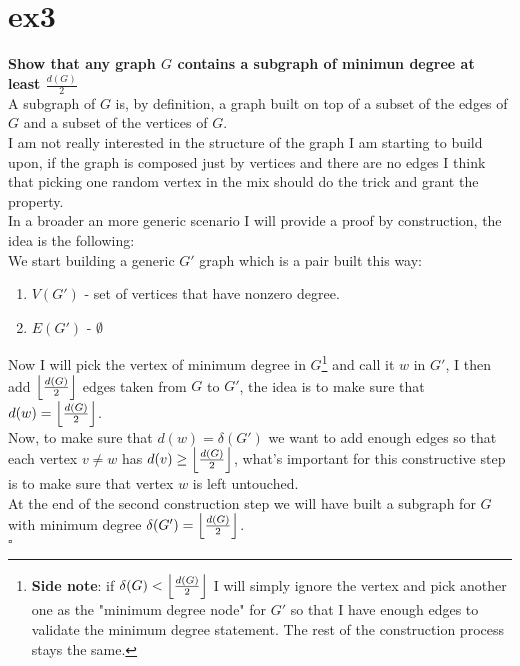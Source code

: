 \section{ex3}
\boldmath
\textbf{Show that any graph $G$ contains a subgraph of minimun degree at least $\frac{d(G)}{2}$}\vspace{10pt}\\
\unboldmath
A subgraph of $G$ is, by definition, a graph built on top of a subset of the edges of $G$ and a subset of the vertices of $G$.\\
I am not really interested in the structure of the graph I am starting to build upon, if the graph is composed just by vertices and there are no edges I think that picking one random vertex in the mix should do the trick and grant the property.\\
In a broader an more generic scenario I will provide a proof by construction, the idea is the following:\\
We start building a generic $G'$ graph which is a pair built this way:
\begin{enumerate}
    \item $V(G')$ - set of vertices that have nonzero degree.
    \item $E(G')$ - $\emptyset$
\end{enumerate}
Now I will pick the vertex of minimum degree in $G$\footnote{\textbf{Side note}: if $\delta(G) < \left\lfloor\frac{d(G)}{2}\right\rfloor$ I will simply ignore the vertex and pick another one as the "minimum degree node" for $G'$ so that I have enough edges to validate the minimum degree statement. The rest of the construction process stays the same.} and call it $w$ in $G'$, I then add $\left\lfloor\frac{d(G)}{2}\right\rfloor$ edges taken from $G$ to $G'$, the idea is to make sure that $d(w) = \left\lfloor\frac{d(G)}{2}\right\rfloor$.\\
Now, to make sure that $d(w) = \delta(G')$ we want to add enough edges so that each vertex $v \neq w$ has $d(v) \geq \left\lfloor\frac{d(G)}{2}\right\rfloor$, what's important for this constructive step is to make sure that vertex $w$ is left untouched.\\
At the end of the second construction step we will have built a subgraph for $G$ with minimum degree $\delta(G') = \left\lfloor\frac{d(G)}{2}\right\rfloor$.
\vspace{2pt}\\\hspace*{2.5cm}$\square$